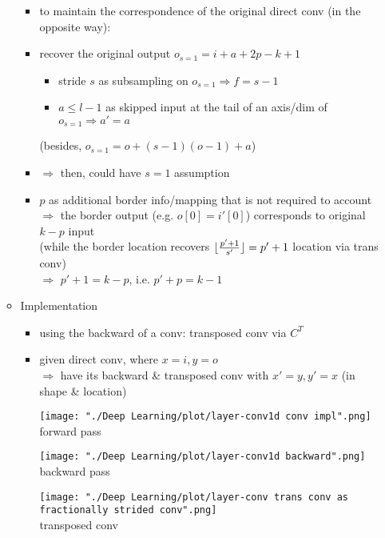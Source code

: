 \begin{itemize}
\begin{itemize}
\begin{itemize}
		\item to maintain the correspondence of the original direct conv (in the opposite way):
		\item recover the original output $o_{s=1}=i+a+2p-k+1$
			\begin{itemize}
			\item stride $s$ as subsampling on $o_{s=1} \Rightarrow f=s-1$
			\item $a\le l-1$ as skipped input at the tail of an axis/dim of $o_{s=1} \Rightarrow a'=a$
			\end{itemize}
		(besides, $o_{s=1}=o+(s-1)(o-1)+a$)
		\item $\Rightarrow$ then, could have $s=1$ assumption
		\item $p$ as additional border info/mapping that is not required to account \\ 
		$\Rightarrow$ the border output (e.g. $o[0]=i'[0]$) corresponds to original $k-p$ input \\
		(while the border location recovers $\lfloor\frac{p'+1}{s'}\rfloor=p'+1$ location via trans conv) \\
		$\Rightarrow$ $p'+1=k-p$, i.e. $p'+p=k-1$
		\end{itemize}
	\item Implementation
		\begin{itemize}
		\item using the backward of a conv: transposed conv via $C^T$
		\item given direct conv, where $x=i, y=o$ \\
		$\Rightarrow$ have its backward \& transposed conv with $x'=y, y'=x$ (in shape \& location) \\
		\begin{minipage}[l]{.3\linewidth}
		\texttt{[image: "./Deep Learning/plot/layer-conv1d conv impl".png]} \\
		\centering
		forward pass
		\end{minipage}
		\begin{minipage}[r]{.2\linewidth}
		\texttt{[image: "./Deep Learning/plot/layer-conv1d backward".png]} \\
		\centering
		backward pass
		\end{minipage}
		\begin{minipage}[r]{.45\linewidth}
		\texttt{[image: "./Deep Learning/plot/layer-conv trans conv as fractionally strided conv".png]} \\
		\centering
		transposed conv

\end{minipage}
\end{itemize}
\end{itemize}
\end{itemize}
